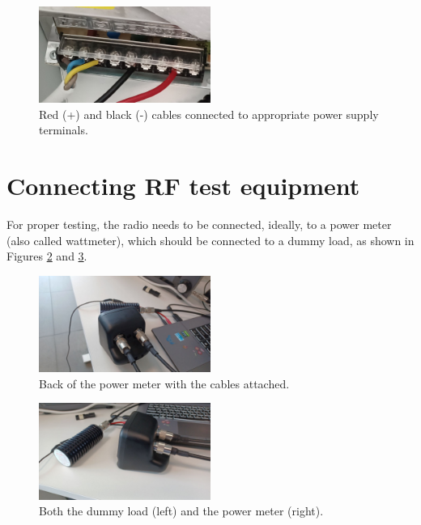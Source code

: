 \documentclass[11pt,a4paper]{article}
\begin{document}
\begin{figure}[!ht]
  \centering
  \includegraphics[width=0.5\textwidth]{pictures/psu2.jpeg}
  \caption{Red (+) and black (-) cables connected to appropriate power supply terminals.}
  \label{fig:psu2}
\end{figure}

\section{Connecting RF test equipment}

For proper testing, the radio needs to be connected, ideally, to a power meter (also called wattmeter), which should be connected to a dummy load, as shown in Figures \ref{fig:backview1} and \ref{fig:backview3}.

\begin{figure}[H]
  \centering
  \includegraphics[width=0.5\textwidth]{pictures/wattmeter_1.jpeg}
  \caption{Back of the power meter with the cables attached.}
  \label{fig:backview1}
\end{figure}

\begin{figure}[H]
  \centering
  \includegraphics[width=0.5\textwidth]{pictures/wattmeter_3.jpeg}
  \caption{Both the dummy load (left) and the power meter (right).}
  \label{fig:backview3}
\end{figure}
\end{document}
